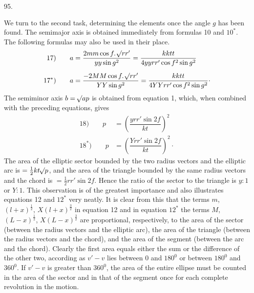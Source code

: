 \par{}\medskip
\hypertarget{native-128-article095}{}
\begin{center}95.\end{center}
We turn to the second task, determining the elements once the angle $g$ has been found. The semimajor axis is obtained immediately from formulas 10 and $10^{\ast}$. The following formulas may also be used in their place.
\[
\begin{aligned}
\mathrm{17)}\qquad a&=\dfrac{2mm\cos f\mathpunct{.}\mathord{{}^{}\!\surd}rr'}{yy\sin g^2}=\dfrac{kktt}{4yyrr'\cos f^2\sin g^2}\\[6pt]
\mathrm{17}^{\ast}\mathrm{)}\qquad a&=\dfrac{-2MM\cos f\mathpunct{.}\mathord{{}^{}\!\surd}rr'}{YY\sin g^2}=\dfrac{kktt}{4YYrr'\cos f^2\sin g^2}\mathpunct{\cdot}
\end{aligned}
\]
The semiminor axis $b=\mathord{{}^{}\!\surd}ap$ is obtained from equation 1, which, when combined with the preceding equations, gives
\[
\begin{aligned}
\mathrm{18)}\qquad p&=\left(\dfrac{yrr'\sin 2f}{kt}\right)^2\\[6pt]
\mathrm{18}^{\ast}\mathrm{)}\qquad p&=\left(\dfrac{Yrr'\sin 2f}{kt}\right)^2\mathpunct{\cdot}
\end{aligned}
\]
The area of the elliptic sector bounded by the two radius vectors and the elliptic arc is $=\frac12 kt\mathord{{}^{}\!\surd}p$, and the area of the triangle bounded by the same radius vectors and the chord is $=\frac12 rr'\sin 2f$. Hence the ratio of the sector to the triangle is $y:1$ or $Y:1$. This observation is of the greatest importance and also illustrates equations 12 and $12^{\ast}$ very neatly. It is clear from this that the terms $m$, $(l+x)^{\frac12}$, $X(l+x)^{\frac32}$ in equation 12 and in equation $12^{\ast}$ the terms $M$, $(L-x)^{\frac12}$, $X(L-x)^{\frac32}$ are proportional, respectively, to the area of the sector (between the radius vectors and the elliptic arc), the area of the triangle (between the radius vectors and the chord), and the area of the segment (between the arc and the chord). Clearly the first area equals either the sum or the difference of the other two, according as $v'-v$ lies between 0 and $180^0$ or between $180^0$ and $360^0$. If $v'-v$ is greater than $360^0$, the area of the entire ellipse must be counted in the area of the sector and in that of the segment once for each complete revolution in the motion.

